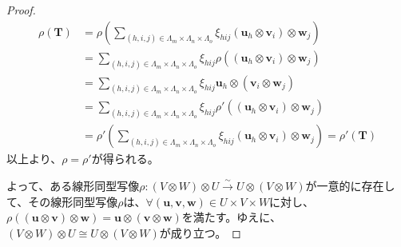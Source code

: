 \documentclass[dvipdfmx]{jsarticle}
\begin{document}
\begin{proof}
\begin{align*}
\rho\left( \mathbf{T} \right) &= \rho\left( \sum_{(h,i,j) \in \varLambda_{m} \times \varLambda_{n} \times \varLambda_{o}} {\xi_{hij}\left( \mathbf{u}_{h} \otimes \mathbf{v}_{i} \right) \otimes \mathbf{w}_{j}} \right)\\
&= \sum_{(h,i,j) \in \varLambda_{m} \times \varLambda_{n} \times \varLambda_{o}} {\xi_{hij}\rho\left( \left( \mathbf{u}_{h} \otimes \mathbf{v}_{i} \right) \otimes \mathbf{w}_{j} \right)}\\
&= \sum_{(h,i,j) \in \varLambda_{m} \times \varLambda_{n} \times \varLambda_{o}} {\xi_{hij}\mathbf{u}_{h} \otimes \left( \mathbf{v}_{i} \otimes \mathbf{w}_{j} \right)}\\
&= \sum_{(h,i,j) \in \varLambda_{m} \times \varLambda_{n} \times \varLambda_{o}} {\xi_{hij}\rho'\left( \left( \mathbf{u}_{h} \otimes \mathbf{v}_{i} \right) \otimes \mathbf{w}_{j} \right)}\\
&= \rho'\left( \sum_{(h,i,j) \in \varLambda_{m} \times \varLambda_{n} \times \varLambda_{o}} {\xi_{hij}\left( \mathbf{u}_{h} \otimes \mathbf{v}_{i} \right) \otimes \mathbf{w}_{j}} \right) = \rho'\left( \mathbf{T} \right)
\end{align*}
以上より、$\rho = \rho'$が得られる。\par
よって、ある線形同型写像$\rho:(V \otimes W) \otimes U\overset{\sim}{\rightarrow}U \otimes (V \otimes W)$が一意的に存在して、その線形同型写像$\rho$は、$\forall\left( \mathbf{u},\mathbf{v},\mathbf{w} \right) \in U \times V \times W$に対し、$\rho\left( \left( \mathbf{u} \otimes \mathbf{v} \right) \otimes \mathbf{w} \right) = \mathbf{u} \otimes \left( \mathbf{v} \otimes \mathbf{w} \right)$を満たす。ゆえに、$(V \otimes W) \otimes U \cong U \otimes (V \otimes W)$が成り立つ。
\end{proof}
\end{document}
